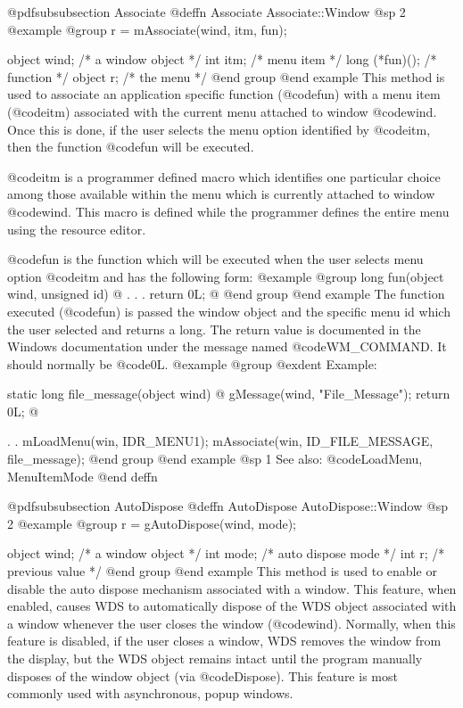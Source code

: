 @pdfsubsubsection {Associate}
@deffn {Associate} Associate::Window
@sp 2
@example
@group
r = mAssociate(wind, itm, fun);

object  wind;   /*  a window object     */
int     itm;    /*  menu item           */
long    (*fun)();  /*  function         */
object   r;        /*  the menu         */
@end group
@end example
This method is used to associate an application specific function
(@code{fun}) with a menu item (@code{itm}) associated with the current
menu attached to window @code{wind}.  Once this is done, if the user selects
the menu option identified by @code{itm}, then the function @code{fun}
will be executed.

@code{itm} is a programmer defined macro which identifies one particular
choice among those available within the menu which is currently attached
to window @code{wind}.  This macro is defined while the programmer defines
the entire menu using the resource editor.

@code{fun} is the function which will be executed when the user selects
menu option @code{itm} and has the following form:
@example
@group
long    fun(object wind, unsigned id)
@{
        .
        .
        .
        return 0L;
@}
@end group
@end example
The function executed (@code{fun}) is passed the window object and
the specific menu id which the user selected and
returns a long.  The return value is documented in the Windows documentation
under the message named @code{WM_COMMAND}.  It should normally be @code{0L}.
@example
@group
@exdent Example:

static  long    file_message(object wind)
@{
        gMessage(wind, "File_Message");
        return 0L;
@}

        .
        .
        mLoadMenu(win, IDR_MENU1);
        mAssociate(win, ID_FILE_MESSAGE, file_message);
@end group
@end example
@sp 1
See also:  @code{LoadMenu, MenuItemMode}
@end deffn











@pdfsubsubsection {AutoDispose}
@deffn {AutoDispose} AutoDispose::Window
@sp 2
@example
@group
r = gAutoDispose(wind, mode);

object   wind;     /*  a window object    */
int      mode;     /*  auto dispose mode  */
int      r;        /*  previous value     */
@end group
@end example
This method is used to enable or disable the auto dispose mechanism
associated with a window.  This feature, when enabled, causes WDS to
automatically dispose of the WDS object associated with a window
whenever the user closes the window (@code{wind}).  Normally, when
this feature is disabled, if the user closes a window, WDS removes
the window from the display, but the WDS object remains intact until
the program manually disposes of the window object (via @code{Dispose}).
This feature is most commonly used with asynchronous, popup windows.

